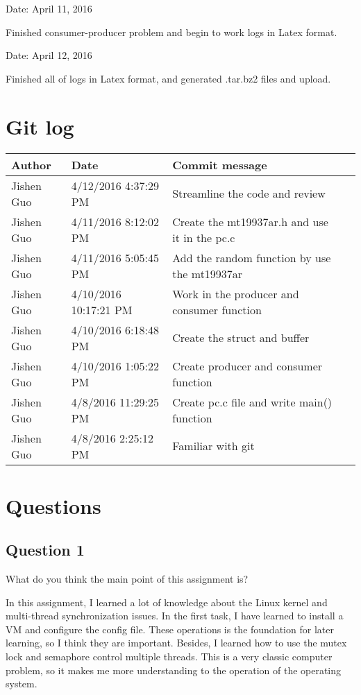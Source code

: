\documentclass[10pt,draftclsnofoot,peerreview,letterpaper,onecolumn,]{IEEEtran}
\begin{document}
Date: April 11, 2016

Finished consumer-producer problem and begin to work logs in Latex format.

Date: April 12, 2016

Finished all of logs in Latex format, and generated .tar.bz2 files and upload.

\newpage
\section{Git log}

\begin{table}[h]
\centering
\begin{tabular}{|l|l|l|l|}
\hline

Author    & Date & Commit message
\\ \hline
Jishen Guo & 4/12/2016 4:37:29 PM & Streamline the code and review
\\ \hline
Jishen Guo & 4/11/2016 8:12:02 PM & Create the mt19937ar.h and use it in the pc.c
\\ \hline
Jishen Guo & 4/11/2016 5:05:45 PM & Add the random function by use the mt19937ar
\\ \hline
Jishen Guo & 4/10/2016 10:17:21 PM & Work in the producer and consumer function
\\ \hline
Jishen Guo & 4/10/2016 6:18:48 PM & Create the struct and buffer
\\ \hline
Jishen Guo & 4/10/2016 1:05:22 PM & Create producer and consumer function
\\ \hline
Jishen Guo & 4/8/2016 11:29:25 PM & Create pc.c file and write main() function
\\ \hline
Jishen Guo & 4/8/2016 2:25:12 PM & Familiar with git
\\ \hline
\end{tabular}
\end{table}
\newpage

\section{Questions}
\subsection{Question 1}

What do you think the main point of this assignment is?

In this assignment, I learned a lot of knowledge about the Linux kernel and multi-thread synchronization issues. In the first task, I have learned to install a VM and configure the config file. These operations is the foundation for later learning, so I think they are important. Besides, I learned how to use the mutex lock and semaphore control multiple threads. This is a very classic computer problem, so it makes me more understanding to the operation of the operating system.
\end{document}
